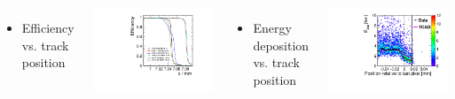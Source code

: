 \begin{frame}
\begin{columns}
  \end{columns}

  \begin{columns}
    
    \begin{itemize}
    \item Efficiency vs. track position
    \end{itemize}
    \centering
    \includegraphics[width=\textwidth, page=9]{../figures/TestBeam/edge_bcp.pdf}
    
    \begin{itemize}
    \item Energy deposition vs. track position
    \end{itemize}
    \centering
    \includegraphics[width=\textwidth]{../figures/ActiveEdge/28_GNDGR_Edep_TCAD_data.pdf}

  \end{columns}

\end{frame}

